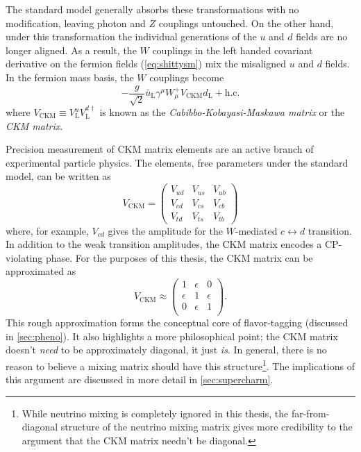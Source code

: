 The standard model generally absorbs these transformations with no modification, leaving photon and $Z$ couplings untouched.
On the other hand, under this transformation the individual generations of the $u$ and $d$ fields are no longer aligned. As a result, the $W$ couplings in the left handed covariant derivative on the fermion fields (\cref{eq:shittysm}) mix the misaligned $u$ and $d$ fields.
In the fermion mass basis, the $W$ couplings become
\begin{equation}
  - \frac{g}{\sqrt{2}} \bar{u}_{\mathrm{L}} \gamma^\mu W^+_\mu V_{\text{CKM}} d_{\mathrm{L}} + \text{h.c.}
\end{equation}
where $V_{\text{CKM}} \equiv V^u_{\mathrm{L}}V^{d\dag}_{\mathrm{L}}$ is known as the \emph{Cabibbo-Kobayasi-Maskawa matrix} or the \emph{CKM matrix}.

Precision measurement of CKM matrix elements are an active branch of experimental particle physics. The elements, free parameters under the standard model, can be written as
\newcommand{\ckmrow}[1]{V_{#1 d} & V_{#1 s} & V_{#1 b}}
\begin{equation}
V_{\text{CKM}} = \begin{pmatrix}
  \ckmrow{u} \\ \ckmrow{c} \\ \ckmrow{t}
\end{pmatrix}
\end{equation}
where, for example, $V_{cd}$ gives the amplitude for the $W$-mediated $c \leftrightarrow d$ transition. In addition to the weak transition amplitudes, the CKM matrix encodes a CP-violating phase. For the purposes of this thesis, the CKM matrix can be approximated as
\begin{equation}
V_{\text{CKM}} \approx
\begin{pmatrix}
  1 & \epsilon & 0 \\
  \epsilon & 1 & \epsilon \\
  0 & \epsilon & 1 \\
\end{pmatrix}.
\end{equation}
This rough approximation forms the conceptual core of flavor-tagging (discussed in \cref{sec:pheno}). It also highlights a more philosophical point; the CKM matrix doesn't \emph{need} to be approximately diagonal, it just \emph{is}. In general, there is no reason to believe a mixing matrix should have this structure\footnote{While neutrino mixing is completely ignored in this thesis, the far-from-diagonal structure of the neutrino mixing matrix gives more credibility to the argument that the CKM matrix needn't be diagonal.}. The implications of this argument are discussed in more detail in \cref{sec:supercharm}.


